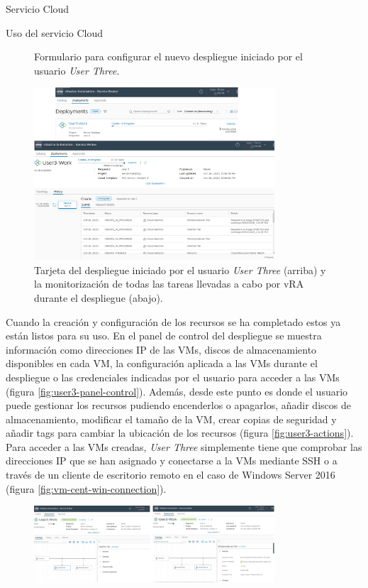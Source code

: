 \begin{subsection}{Servicio Cloud}
\begin{subsubsection}{Uso del servicio Cloud}
\begin{figure}[h]
            \caption{Formulario para configurar el nuevo despliegue iniciado por el usuario \textit{User Three}.}
            \label{fig:login-user-3-form-deployment}
        \end{figure}
        \FloatBarrier
        \begin{figure}[h]
            \centering
            \includegraphics[width=0.8\textwidth]{imaxes/pruebaconcepto/vrealize/deployment-start-user-3-Windows.png}
            \caption{Tarjeta del despliegue iniciado por el usuario \textit{User Three} (arriba) y la monitorización de todas las tareas llevadas a cabo por vRA durante el despliegue (abajo).}
            \label{fig:deployment-process-user-3}
        \end{figure}
        \FloatBarrier
        Cuando la creación y configuración de los recursos se ha completado estos ya están listos para su uso. En el panel de control del despliegue se muestra información como direcciones IP de las VMs, discos de almacenamiento disponibles en cada VM, la configuración aplicada a las VMs durante el despliegue o las credenciales indicadas por el usuario para acceder a las VMs (figura \ref{fig:user3-panel-control}). Además, desde este punto es donde el usuario puede gestionar los recursos pudiendo encenderlos o apagarlos, añadir discos de almacenamiento, modificar el tamaño de la VM, crear copias de seguridad y añadir tags para cambiar la ubicación de los recursos (figura \ref{fig:user3-actions}). Para acceder a las VMs creadas, \textit{User Three} simplemente tiene que comprobar las direcciones IP que se han asignado y conectarse a la VMs mediante SSH o a través de un cliente de escritorio remoto en el caso de Windows Server 2016 (figura \ref{fig:vm-cent-win-connection}).
        \begin{figure}[h]
            \centering
            \includegraphics[width=0.8\textwidth]{imaxes/pruebaconcepto/vrealize/user3-info-centos.png}

\end{figure}
\end{subsubsection}
\end{subsection}
